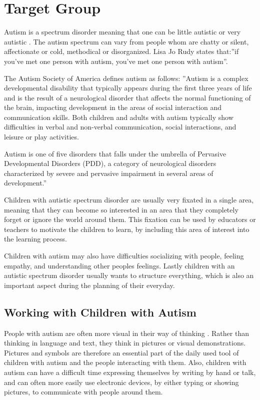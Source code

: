 \section{Target Group}
Autism is a spectrum disorder meaning that one can be little autistic or very autistic \cite{autism.about.com1}. The autism spectrum can vary from people whom are chatty or silent, affectionate or cold, methodical or disorganized. Lisa Jo Rudy states \cite{autism.about.com2} that:''if you've met one person with autism, you've met one person with autism''.

The Autism Society of America defines autism \cite{definitionOfAutism} as follows: ''Autism is a complex developmental disability that typically appears during the first three years of life and is the result of a neurological disorder that affects the normal functioning of the brain, impacting development in the areas of social interaction and communication skills. Both children and adults with autism typically show difficulties in verbal and non-verbal communication, social interactions, and leisure or play activities.

Autism is one of five disorders that falls under the umbrella of Pervasive Developmental Disorders (PDD), a category of neurological disorders characterized by severe and pervasive impairment in several areas of development.''

Children with autistic spectrum disorder are usually very fixated in a single area, meaning that they can become so interested in an area that they completely forget or ignore the world around them. This fixation can be used by educators or teachers to motivate the children to learn, by including this area of interest into the learning process.

   Children with autism may also have difficulties socializing with people, feeling empathy, and understanding other peoples feelings. Lastly children with an autistic spectrum disorder usually wants to structure everything, which is also an important aspect during the planning of their everyday.
   
\subsection{Working with Children with Autism}
People with autism are often more visual in their way of thinking \cite{autism.com}. Rather than thinking in language and text, they think in pictures or visual demonstrations. Pictures and symbols are therefore an essential part of the daily used tool of children with autism and the people interacting with them. Also, children with autism can have a difficult time expressing themselves by writing by hand or talk, and can often more easily use electronic devices, by either typing or showing pictures, to communicate with people around them.

